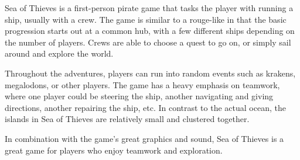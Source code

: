 \documentclass{article}
\begin{document}
Sea of Thieves is a first-person pirate game that tasks the player with running
a ship, usually with a crew. The game is similar to a rouge-like in that the
basic progression starts out at a common hub, with a few different ships
depending on the number of players. Crews are able to choose a quest to go on,
or simply sail around and explore the world.

Throughout the adventures, players can run into random events such as krakens,
megalodons, or other players. The game has a heavy emphasis on teamwork, where
one player could be steering the ship, another navigating and giving directions,
another repairing the ship, etc. In contrast to the actual ocean, the islands in
Sea of Thieves are relatively small and clustered together.

In combination with the game's great graphics and sound, Sea of Thieves is a
great game for players who enjoy teamwork and exploration.
\end{document}

